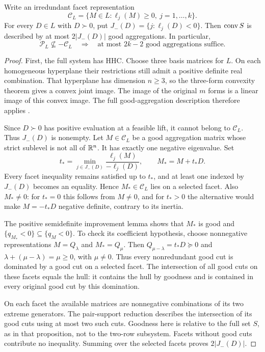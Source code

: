 \begin{proposition}\label{prop:facet-bound}
Write an irredundant facet representation
\[
 \mathcal C_L=\{M\in L:\ell_j(M)\geq0,\ j=1,\ldots,k\}.
\]
For every $D\in L$ with $D\succ0$, put
$J_-(D)=\{j:\ell_j(D)<0\}$. Then $\operatorname{conv} S$ is described by
at most $2|J_-(D)|$ good aggregations. In particular,
\begin{equation}\label{eq:conditional-facet-bound}
 \mathcal P_L\not\subseteq-\mathcal C_L
 \quad\Longrightarrow\quad
 \text{at most }2k-2\text{ good aggregations suffice}.
\end{equation}
\end{proposition}
\begin{proof}
First, the full system has HHC. Choose three basis matrices for $L$.
On each homogeneous hyperplane their restrictions still admit a positive
definite real combination. That hyperplane has dimension $n\geq3$, so
the three-form convexity theorem \citep[Theorem~2.1]{Polyak1998}
gives a convex joint image. The image of the original $m$ forms is a
linear image of this convex image. The full good-aggregation description
therefore applies \citep[Theorem~2.9]{BDSpreprint}.

Since $D\succ0$ has positive evaluation at a feasible lift, it cannot
belong to $\mathcal C_L$. Thus $J_-(D)$ is nonempty. Let $M\in\mathcal C_L$
be a good aggregation matrix whose strict sublevel is not all of
$\mathbb R^n$. It has exactly one negative eigenvalue. Set
\[
 t_* =\min_{j\in J_-(D)}
       \frac{\ell_j(M)}{-\ell_j(D)},\qquad M_*=M+t_*D.
\]
Every facet inequality remains satisfied up to $t_*$, and at least one
indexed by $J_-(D)$ becomes an equality. Hence $M_*\in\mathcal C_L$
lies on a selected facet. Also $M_*\ne0$: for $t_*=0$ this follows
from $M\ne0$, and for $t_*>0$ the alternative would make
$M=-t_*D$ negative definite, contrary to its inertia.

The positive semidefinite improvement lemma
\citep[Proposition~9.1]{BDSpreprint} shows that $M_*$ is good and
$\{q_{M_*}<0\}\subseteq\{q_M<0\}$. To check its coefficient
hypothesis, choose nonnegative representations $M=Q_\lambda$ and
$M_*=Q_\mu$. Then $Q_{\mu-\lambda}=t_*D\succeq0$ and
$\lambda+(\mu-\lambda)=\mu\geq0$, with $\mu\ne0$. Thus every
nonredundant good cut is dominated by a good cut on a selected facet.
The intersection of all good cuts on these facets equals the hull:
it contains the hull by goodness and is contained in every original good
cut by this domination.

On each facet the available matrices are nonnegative combinations of
its two extreme generators. The pair-support reduction
\citep[Proposition~9.6]{BDSpreprint} describes the intersection of its
good cuts using at most two such cuts. Goodness here is relative to the
full set $S$, as in that proposition, not to the two-row subsystem.
Facets without good cuts contribute no inequality. Summing over the
selected facets proves $2|J_-(D)|$.


\end{proof}
